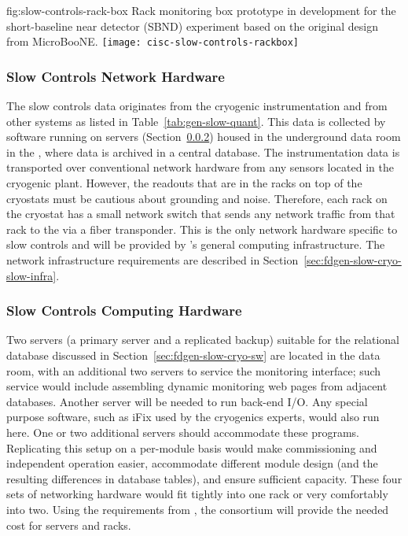 \begin{dunefigure}{fig:slow-controls-rack-box}
{Rack monitoring box prototype in development for the short-baseline near detector (SBND) experiment based on the original design from MicroBooNE.}
\texttt{[image: cisc-slow-controls-rackbox]}
\end{dunefigure}


\subsubsection{Slow Controls Network Hardware}
\label{sec:fdgen-slow-cryo-slow-network}
The slow controls data originates from the cryogenic instrumentation and from other systems as listed in Table~\ref{tab:gen-slow-quant}. This data is collected by software running on servers
(Section~\ref{sec:fdgen-slow-cryo-slow-compute})
housed in the underground data room in the ,
where data is archived in a central  database.
The instrumentation data is transported over
conventional network hardware from any sensors located in the cryogenic
plant.  However, the readouts that are in the racks on top of the
cryostats must be cautious about grounding and noise.  Therefore, each
rack on the cryostat has a small network switch that sends
any network traffic from that rack to the  via a fiber transponder.
This is the only network hardware specific to slow controls and will be provided by %
\surf{}'s  
general computing infrastructure. %
The network infrastructure requirements are described in
Section~\ref{sec:fdgen-slow-cryo-slow-infra}.

\subsubsection{Slow Controls Computing Hardware}
\label{sec:fdgen-slow-cryo-slow-compute}
Two servers (a primary server and a replicated backup) suitable for the relational database discussed
in Section~\ref{sec:fdgen-slow-cryo-sw} are located in the  data
room, with an additional
two servers to service the  monitoring interface; such service would include assembling dynamic  monitoring web pages from adjacent
databases.  Another server will be needed to run back-end I/O.  Any special purpose software, such as iFix used by the cryogenics experts, would
also run here. One or two additional servers should accommodate these programs.
Replicating this setup on a per-module basis would make commissioning and independent operation easier, accommodate different module
design (and the resulting differences in database tables), and ensure
sufficient capacity.  These four sets of networking hardware would fit tightly into one rack or very comfortably into two. Using the requirements from , the  consortium will provide the needed cost 
for servers and racks. 




